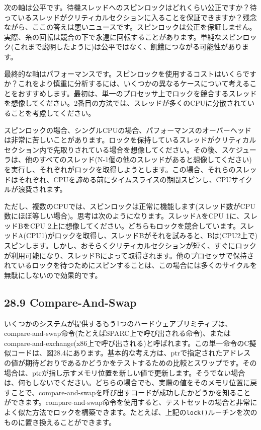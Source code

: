 次の軸は公平です。待機スレッドへのスピンロックはどれくらい公正ですか？待っているスレッドがクリティカルセクションに入ることを保証できますか？残念ながら、ここの答えは悪いニュースです。スピンロックは公正を保証しません。実際、糸の回転は競合の下で永遠に回転することがあります。単純なスピンロック(これまで説明したように)は公平ではなく、飢餓につながる可能性があります。

最終的な軸はパフォーマンスです。スピンロックを使用するコストはいくらですか？これをより慎重に分析するには、いくつかの異なるケースについて考えることをおすすめします。最初は、単一のプロセッサ上でロックを競合するスレッドを想像してください。2番目の方法では、スレッドが多くのCPUに分散されていることを考慮してください。

スピンロックの場合、シングルCPUの場合、パフォーマンスのオーバーヘッドは非常に苦しいことがあります。ロックを保持しているスレッドがクリティカルセクション内で先取りされている場合を想像してください。その後、スケジューラは、他のすべてのスレッド(N-1個の他のスレッドがあると想像してください)を実行し、それぞれがロックを取得しようとします。この場合、それらのスレッドはそれぞれ、CPUを諦める前にタイムスライスの期間スピンし、CPUサイクルが浪費されます。

ただし、複数のCPUでは、スピンロックは正常に機能します(スレッド数がCPU数にほぼ等しい場合)。思考は次のようになります。スレッドAをCPU
1に、スレッドBをCPU
2上に想像してください。どちらもロックを競合しています。スレッドA(CPU1)がロックを取得し、スレッドBがそれを試みると、Bは(CPU2上で)スピンします。しかし、おそらくクリティカルセクションが短く、すぐにロックが利用可能になり、スレッドBによって取得されます。他のプロセッサで保持されているロックを待つためにスピンすることは、この場合には多くのサイクルを無駄にしないので効果的です。

\hypertarget{compare-and-swap}{%
\subsection*{28.9 Compare-And-Swap}\label{compare-and-swap}}

いくつかのシステムが提供するもう1つのハードウェアプリミティブは、compare-and-swap命令(たとえばSPARC上で呼び出される命令)、またはcompare-and-exchange(x86上で呼び出される)と呼ばれます。この単一命令のC擬似コードは、図28.4にあります。基本的な考え方は、ptrで指定されたアドレスの値が期待どおりであるかどうかをテストするための比較とスワップです。その場合は、ptrが指し示すメモリ位置を新しい値で更新します。そうでない場合は、何もしないでください。どちらの場合でも、実際の値をそのメモリ位置に戻すことで、compare-and-swapを呼び出すコードが成功したかどうかを知ることができます。compare-and-swap命令を使用すると、テストセットの場合と非常によく似た方法でロックを構築できます。たとえば、上記の\texttt{lock()}ルーチンを次のものに置き換えることができます。

